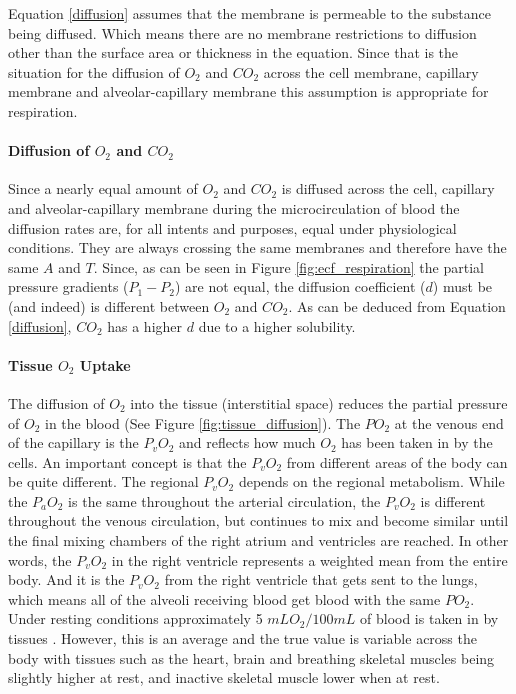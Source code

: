 Equation \ref{diffusion} assumes that the membrane is permeable to the substance being diffused. Which means there are no membrane restrictions to diffusion other than the surface area or thickness in the equation. Since that is the situation for the diffusion of $O_2$ and $CO_2$ across the cell membrane, capillary membrane and alveolar-capillary membrane this assumption is appropriate for respiration.

\paragraph{Diffusion of $O_2$ and $CO_2$}

Since a nearly equal amount of $O_2$ and $CO_2$ is diffused across the cell, capillary and alveolar-capillary membrane during the microcirculation of blood the diffusion rates are, for all intents and purposes, equal under physiological conditions. They are always crossing the same membranes and therefore have the same $A$ and $T$. Since, as can be seen in Figure \ref{fig:ecf_respiration} the partial pressure gradients ($P_1 - P_2$) are not equal, the diffusion coefficient ($d$) must be (and indeed) is different between $O_2$ and $CO_2$. As can be deduced from Equation \ref{diffusion}, $CO_2$ has a higher $d$ due to a higher solubility.\footnotemark{}

\paragraph{Tissue $O_2$ Uptake}

The diffusion of $O_2$ into the tissue (interstitial space) reduces the partial pressure of $O_2$ in the blood (See Figure \ref{fig:tissue_diffusion}). The $PO_2$ at the venous end of the capillary is the $P_vO_2$ and reflects how much $O_2$ has been taken in by the cells. An important concept is that the $P_vO_2$ from different areas of the body can be quite different. The regional $P_vO_2$ depends on the regional metabolism. While the $P_aO_2$ is the same throughout the arterial circulation, the $P_vO_2$ is different throughout the venous circulation, but continues to mix and become similar until the final mixing chambers of the right atrium and ventricles are reached. In other words, the $P_vO_2$ in the right ventricle represents a weighted mean from the entire body. And it is the $P_vO_2$ from the right ventricle that gets sent to the lungs, which means all of the alveoli receiving blood get blood with the same $PO_2$. Under resting conditions approximately 5 $mL O_2 / 100 mL$ of blood is taken in by tissues \cite{hall_guyton_2020}. However, this is an average and the true value is variable across the body with tissues such as the heart, brain and breathing skeletal muscles being slightly higher at rest, and inactive skeletal muscle lower when at rest.

